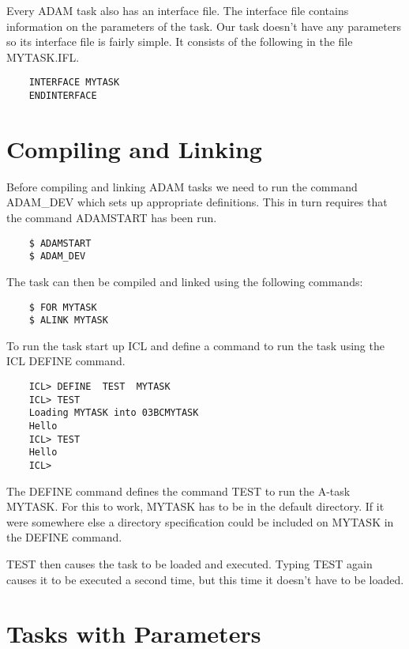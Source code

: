 \documentclass[twoside,11pt]{report}
\newcommand{\xlabel}[1]{}
\begin{document}
Every ADAM task also has an interface file. The interface file contains
information on the parameters of the task. Our task doesn't have any parameters
so its interface file is fairly simple. It consists of the following in
the file MYTASK.IFL.

\begin{verbatim}
    INTERFACE MYTASK
    ENDINTERFACE
\end{verbatim}      

\section{\xlabel{compiling_and_linking}Compiling and Linking}

Before compiling and linking ADAM tasks we need to run the command ADAM\_DEV
which sets up appropriate definitions. This in turn requires
that the command ADAMSTART has been run.

\begin{verbatim}
    $ ADAMSTART
    $ ADAM_DEV
\end{verbatim}

The task can then be compiled and linked using the following commands:

\begin{verbatim}
    $ FOR MYTASK
    $ ALINK MYTASK
\end{verbatim}

To run the task start up ICL and define a command to run the task using
the ICL DEFINE command.

\begin{verbatim}
    ICL> DEFINE  TEST  MYTASK
    ICL> TEST
    Loading MYTASK into 03BCMYTASK
    Hello
    ICL> TEST
    Hello
    ICL>
\end{verbatim}
The DEFINE command defines the command TEST to run the A-task MYTASK. For
this to work, MYTASK has to be in the default directory. If it were somewhere
else a directory specification could be included on MYTASK in the DEFINE
command.

TEST then causes the task to be loaded and executed. Typing TEST again causes
it to be executed a second time, but this time it doesn't have to be loaded.
                                                                        
\section{\xlabel{tasks_with_parameters}Tasks with Parameters}
\end{document}
